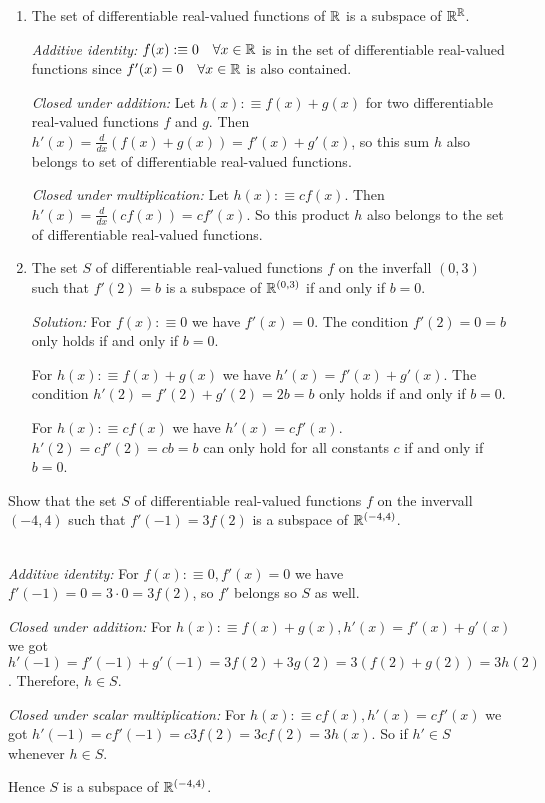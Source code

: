 \begin{xrcs}
\begin{enumerate}
    \item{
      The set of differentiable real-valued functions of $\mathbb{R}$ is a subspace of $\mathbb{R}^{\mathbb{R}}$.

      \emph{Additive identity:} $f(x) :\equiv 0 \quad \forall x \in \mathbb{R}$ is in the set of differentiable real-valued functions since $f'(x) = 0 \quad \forall x \in \mathbb{R}$ is also contained.

      \emph{Closed under addition:} Let $h(x) :\equiv f(x) + g(x)$ for two differentiable real-valued functions $f$ and $g$. Then $h'(x) = \frac{d}{dx} (f(x)+g(x)) = f'(x) + g'(x)$, so this sum $h$ also belongs to set of differentiable real-valued functions.

      \emph{Closed under multiplication:} Let $h(x) :\equiv c f(x)$. Then $h'(x) = \frac{d}{dx} (c f(x)) = c f'(x)$. So this product $h$ also belongs to the set of differentiable real-valued functions.
    }

    \item{
      The set $S$ of differentiable real-valued functions $f$ on the inverfall $(0,3)$ such that $f'(2) = b$ is a subspace of $\mathbb{R}^{(0,3)}$ if and only if $b=0$.

      \emph{Solution:} For $f(x) :\equiv 0$ we have $f'(x) = 0$. The condition $f'(2) =  0 = b$ only holds if and only if $b=0$.

      For $h(x) :\equiv f(x) + g(x)$ we have $h'(x) = f'(x) + g'(x)$. The condition $h'(2) = f'(2) + g'(2) = 2b = b$ only holds if and only if $b=0$.

      For $h(x) :\equiv cf(x)$ we have $h'(x) = cf'(x)$. $h'(2) = cf'(2) = cb = b$ can only hold for all constants $c$ if and only if $b=0$.
    }
  \end{enumerate}
\end{xrcs}


\begin{xrcs}
  Show that the set $S$ of differentiable real-valued functions $f$ on the invervall $(-4,4)$ such that $f'(-1) = 3f(2)$ is a subspace of $\mathbb{R}^{(-4,4)}$.

   \\
  \emph{Additive identity:} For $f(x) :\equiv 0, f'(x) = 0$ we have $f'(-1) = 0 = 3 \cdot 0 = 3f(2)$, so $f'$ belongs so $S$ as well.

  \emph{Closed under addition:} For $h(x) :\equiv f(x) + g(x), h'(x) = f'(x) + g'(x)$ we got $h'(-1) = f'(-1) + g'(-1) = 3f(2) + 3g(2) = 3(f(2)+g(2)) = 3h(2)$. Therefore, $h \in S$.

  \emph{Closed under scalar multiplication:} For $h(x) :\equiv cf(x), h'(x) = cf'(x)$ we got $h'(-1) = cf'(-1) = c3f(2) = 3cf(2) = 3h(x)$. So if $h' \in S$ whenever $h \in S$.

  Hence $S$ is a subspace of $\mathbb{R}^{(-4,4)}$.
\end{xrcs}

